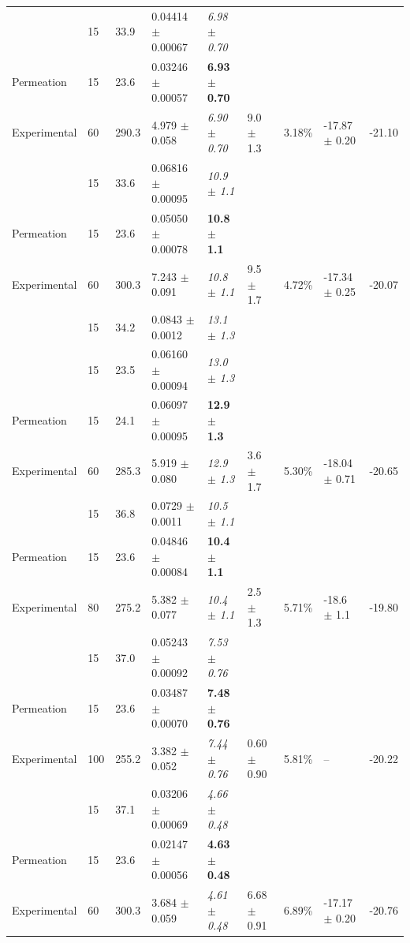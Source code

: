 \begin{chplandscape}
\begin{small}
\begin{longtable}{p{1.9cm}p{0.9cm}p{1.0cm}p{2.7cm}p{1.8cm}p{1.7cm}p{1.5cm}p{2.1cm}p{1.4cm}}
 & 15 & 33.9 & 0.04414 $\pm$ 0.00067 & \textit{6.98 $\pm$ 0.70} &  &  &  &  \\
Permeation & 15 & 23.6 & 0.03246 $\pm$ 0.00057 & \textbf{6.93 $\pm$ 0.70} &  &  &  &  \\
Experimental & 60 & 290.3 & 4.979 $\pm$ 0.058 & \textit{6.90 $\pm$ 0.70} & 9.0 $\pm$ 1.3 & 3.18\% & -17.87 $\pm$ 0.20 & -21.10 \\
 & 15 & 33.6 & 0.06816 $\pm$ 0.00095 & \textit{10.9 $\pm$ 1.1} &  &  &  &  \\
Permeation & 15 & 23.6 & 0.05050 $\pm$ 0.00078 & \textbf{10.8 $\pm$ 1.1} &  &  &  &  \\
Experimental & 60 & 300.3 & 7.243 $\pm$ 0.091 & \textit{10.8 $\pm$ 1.1} & 9.5 $\pm$ 1.7 & 4.72\% & -17.34 $\pm$ 0.25 & -20.07 \\
 & 15 & 34.2 & 0.0843 $\pm$ 0.0012 & \textit{13.1 $\pm$ 1.3} &  &  &  &  \\
 & 15 & 23.5 & 0.06160 $\pm$ 0.00094 & \textit{13.0 $\pm$ 1.3} &  &  &  &  \\
Permeation & 15 & 24.1 & 0.06097 $\pm$ 0.00095 & \textbf{12.9 $\pm$ 1.3} &  &  &  &  \\
Experimental & 60 & 285.3 & 5.919 $\pm$ 0.080 & \textit{12.9 $\pm$ 1.3} & 3.6 $\pm$ 1.7 & 5.30\% & -18.04 $\pm$ 0.71 & -20.65 \\
 & 15 & 36.8 & 0.0729 $\pm$ 0.0011 & \textit{10.5 $\pm$ 1.1} &  &  &  &  \\
Permeation & 15 & 23.6 & 0.04846 $\pm$ 0.00084 & \textbf{10.4 $\pm$ 1.1} &  &  &  &  \\
Experimental & 80 & 275.2 & 5.382 $\pm$ 0.077 & \textit{10.4 $\pm$ 1.1} & 2.5 $\pm$ 1.3 & 5.71\% & -18.6 $\pm$ 1.1 & -19.80 \\
 & 15 & 37.0 & 0.05243 $\pm$ 0.00092 & \textit{7.53 $\pm$ 0.76} &  &  &  &  \\
Permeation & 15 & 23.6 & 0.03487 $\pm$ 0.00070 & \textbf{7.48 $\pm$ 0.76} &  &  &  &  \\
Experimental & 100 & 255.2 & 3.382 $\pm$ 0.052 & \textit{7.44 $\pm$ 0.76} & 0.60 $\pm$ 0.90 & 5.81\% & -- & -20.22 \\
 & 15 & 37.1 & 0.03206 $\pm$ 0.00069 & \textit{4.66 $\pm$ 0.48} &  &  &  &  \\
Permeation & 15 & 23.6 & 0.02147 $\pm$ 0.00056 & \textbf{4.63 $\pm$ 0.48} &  &  &  &  \\
Experimental & 60 & 300.3 & 3.684 $\pm$ 0.059 & \textit{4.61 $\pm$ 0.48} & 6.68 $\pm$ 0.91 & 6.89\% & -17.17 $\pm$ 0.20 & -20.76 \\

\end{longtable}
\end{small}
\end{chplandscape}
